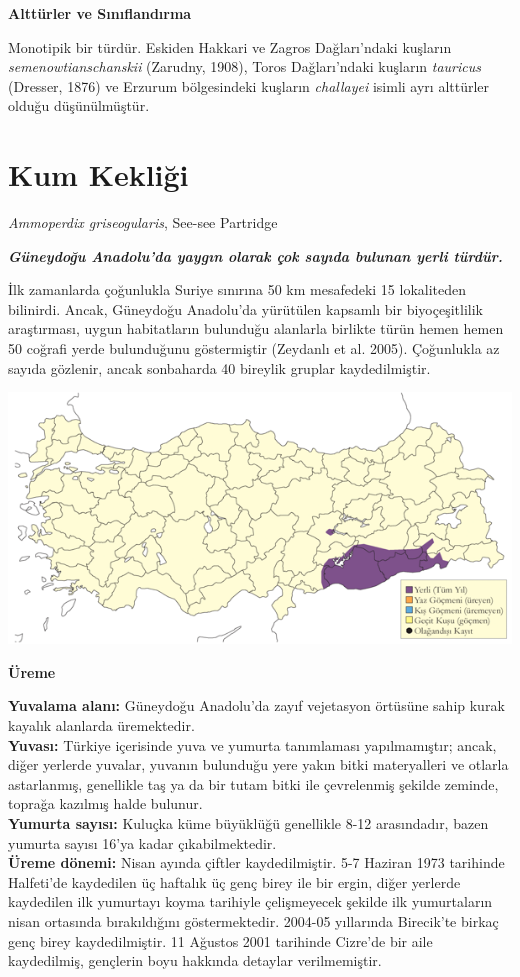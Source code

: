 \documentclass[
  letterpaper,
  DIV=11,
  numbers=noendperiod]{scrreprt}
\begin{document}
\textbf{Alttürler ve Sınıflandırma}

Monotipik bir türdür. Eskiden Hakkari ve Zagros Dağları'ndaki kuşların
\emph{semenowtianschanskii} (Zarudny, 1908), Toros Dağları'ndaki
kuşların \emph{tauricus} (Dresser, 1876) ve Erzurum bölgesindeki
kuşların \emph{challayei} isimli ayrı alttürler olduğu düşünülmüştür.

\section{Kum Kekliği}\label{kum-kekliux11fi}

\emph{Ammoperdix griseogularis}, See-see Partridge

\textbf{\emph{Güneydoğu Anadolu'da yaygın olarak çok sayıda bulunan
yerli türdür.}}

İlk zamanlarda çoğunlukla Suriye sınırına 50 km mesafedeki 15
lokaliteden bilinirdi. Ancak, Güneydoğu Anadolu'da yürütülen kapsamlı
bir biyoçeşitlilik araştırması, uygun habitatların bulunduğu alanlarla
birlikte türün hemen hemen 50 coğrafi yerde bulunduğunu göstermiştir
(Zeydanlı et al. 2005). Çoğunlukla az sayıda gözlenir, ancak sonbaharda
40 bireylik gruplar kaydedilmiştir.

\includegraphics{images/harita_Page_040.png}

\textbf{Üreme}

\textbf{Yuvalama alanı:} Güneydoğu Anadolu'da zayıf vejetasyon örtüsüne
sahip kurak kayalık alanlarda üremektedir.\\
\textbf{Yuvası:} Türkiye içerisinde yuva ve yumurta tanımlaması
yapılmamıştır; ancak, diğer yerlerde yuvalar, yuvanın bulunduğu yere
yakın bitki materyalleri ve otlarla astarlanmış, genellikle taş ya da
bir tutam bitki ile çevrelenmiş şekilde zeminde, toprağa kazılmış halde
bulunur.\\
\textbf{Yumurta sayısı:} Kuluçka küme büyüklüğü genellikle 8-12
arasındadır, bazen yumurta sayısı 16'ya kadar çıkabilmektedir.\\
\textbf{Üreme dönemi:} Nisan ayında çiftler kaydedilmiştir. 5-7 Haziran
1973 tarihinde Halfeti'de kaydedilen üç haftalık üç genç birey ile bir
ergin, diğer yerlerde kaydedilen ilk yumurtayı koyma tarihiyle
çelişmeyecek şekilde ilk yumurtaların nisan ortasında bırakıldığını
göstermektedir. 2004-05 yıllarında Birecik'te birkaç genç birey
kaydedilmiştir. 11 Ağustos 2001 tarihinde Cizre'de bir aile kaydedilmiş,
gençlerin boyu hakkında detaylar verilmemiştir.
\end{document}
